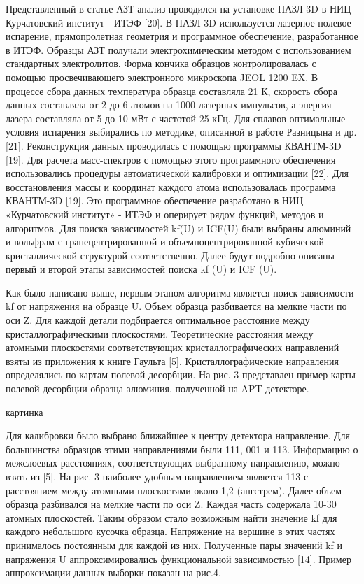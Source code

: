 Представленный в статье АЗТ-анализ проводился на установке ПАЗЛ-3D в НИЦ Курчатовский институт - ИТЭФ [20]. В ПАЗЛ-3D используется лазерное полевое испарение, прямопролетная геометрия и программное обеспечение, разработанное в ИТЭФ. Образцы АЗТ получали электрохимическим методом с использованием стандартных электролитов. Форма кончика образцов контролировалась с помощью просвечивающего электронного микроскопа JEOL 1200 EX. В процессе сбора данных температура образца составляла 21 К, скорость сбора данных составляла от 2 до 6 атомов на 1000 лазерных импульсов, а энергия лазера составляла от 5 до 10 мВт с частотой 25 кГц. Для сплавов оптимальные условия испарения выбирались по методике, описанной в работе Разницына и др. [21]. Реконструкция данных проводилась с помощью программы КВАНТМ-3D [19]. Для расчета масс-спектров с помощью этого программного обеспечения использовались процедуры автоматической калибровки и оптимизации [22].
Для восстановления массы и координат каждого атома использовалась программа КВАНТМ-3D [19]. Это программное обеспечение разработано в НИЦ «Курчатовский институт» - ИТЭФ и оперирует рядом функций, методов и алгоритмов.
Для поиска зависимостей kf(U) и ICF(U) были выбраны алюминий и вольфрам с гранецентрированной и объемноцентрированной кубической кристаллической структурой соответственно. Далее будут подробно описаны первый и второй этапы зависимостей поиска kf (U) и ICF (U).

Как было написано выше, первым этапом алгоритма является поиск зависимости kf от напряжения на образце U. Объем образца разбивается на мелкие части по оси Z. Для каждой детали подбирается оптимальное расстояние между кристаллографическими плоскостями. Теоретические расстояния между атомными плоскостями соответствующих кристаллографических направлений взяты из приложения к книге Гаульта [5]. Кристаллографические направления определялись по картам полевой десорбции. На рис. 3 представлен пример карты полевой десорбции образца алюминия, полученной на APT-детекторе.

картинка 

Для калибровки было выбрано ближайшее к центру детектора направление. Для большинства образцов этими направлениями были {111}, {001} и {113}. Информацию о межслоевых расстояниях, соответствующих выбранному направлению, можно взять из [5]. На рис. 3 наиболее удобным направлением является {113} с расстоянием между атомными плоскостями около 1,2 (ангстрем). Далее объем образца разбивался на мелкие части по оси Z. Каждая часть содержала 10-30 атомных плоскостей. Таким образом стало возможным найти значение kf для каждого небольшого кусочка образца. Напряжение на вершине в этих частях принималось постоянным для каждой из них. Полученные пары значений kf и напряжения U аппроксимировались функциональной зависимостью [14]. Пример аппроксимации данных выборки показан на рис.4.


